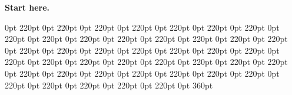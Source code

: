 \documentclass[a4paper,11pt]{article}
\begin{document}
\vspace*{5cm}
\noindent\textbf{Start here.}\par
 0pt 220pt 0pt 220pt 0pt 220pt 0pt 220pt 0pt 220pt 0pt 220pt 0pt 220pt 0pt 220pt 0pt 220pt 0pt 220pt 0pt 220pt 0pt 220pt 0pt 220pt 0pt 220pt 0pt 220pt 0pt 220pt 0pt 220pt 0pt 220pt 0pt 220pt 0pt 220pt 0pt 220pt 0pt 220pt 0pt 220pt 0pt 220pt 0pt 220pt 0pt 220pt 0pt 220pt 0pt 220pt 0pt 220pt 0pt 220pt 0pt 220pt 0pt 220pt 0pt 220pt 0pt 220pt 0pt 220pt 0pt 220pt 0pt 220pt 0pt 220pt 0pt 220pt 0pt 220pt 0pt 220pt 0pt 220pt 0pt 360pt
\lipsum[1-3]
\end{document}
